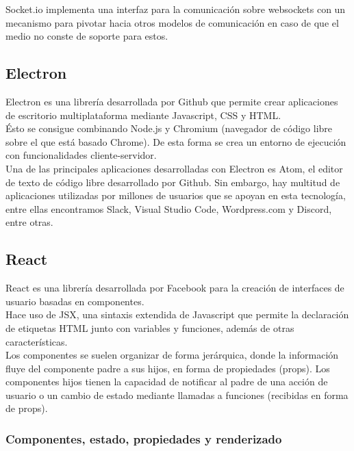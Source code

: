 Socket.io implementa una interfaz para la comunicación sobre websockets con un mecanismo para pivotar hacia otros modelos de comunicación en caso de que el medio no conste de soporte para estos. \\
\subsection {Electron}

Electron es una librería desarrollada por Github que permite crear aplicaciones de escritorio multiplataforma mediante Javascript, CSS y HTML. \\
Ésto se consigue combinando Node.js y Chromium (navegador de código libre sobre el que está basado Chrome). De esta forma se crea un entorno de ejecución con funcionalidades cliente-servidor. \\

Una de las principales aplicaciones desarrolladas con Electron es Atom, el editor de texto de código libre desarrollado por Github. Sin embargo, hay multitud de aplicaciones utilizadas por millones de usuarios que se apoyan en esta tecnología, entre ellas encontramos Slack, Visual Studio Code, Wordpress.com y Discord, entre otras. \\

\subsection {React}

React es una librería desarrollada por Facebook para la creación de interfaces de usuario basadas en componentes. \\

Hace uso de JSX, una sintaxis extendida de Javascript que permite la declaración de etiquetas HTML junto con variables y funciones, además de otras características. \\

Los componentes se suelen organizar de forma jerárquica, donde la información fluye del componente padre a sus hijos, en forma de propiedades (props). Los componentes hijos tienen la capacidad de notificar al padre de una acción de usuario o un cambio de estado mediante llamadas a funciones (recibidas en forma de props).\\

\subsubsection {Componentes, estado, propiedades y renderizado}

